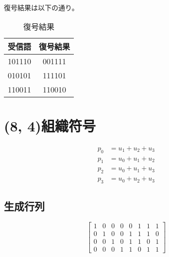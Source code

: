 \documentclass[a4paper,11pt]{jsarticle}
\begin{document}
復号結果は以下の通り。

\begin{table}[hbtp]
  \caption{復号結果}
  \label{table:decoded}
  \centering
  \begin{tabular}{|cc|}
    \hline
    受信語 & 復号結果 \\ \hline
    101110 & 001111 \\ \hline
    010101 & 111101 \\ \hline
    110011 & 110010 \\ \hline
  \end{tabular}
\end{table}

\section{(8, 4)組織符号}
\begin{eqnarray*}
  p_0 &= u_1 + u_2 + u_3 \\
  p_1 &= u_0 + u_1 + u_2 \\
  p_2 &= u_0 + u_1 + u_3 \\
  p_3 &= u_0 + u_2 + u_3
\end{eqnarray*}
\subsection{生成行列}
\begin{equation*}
  \begin{bmatrix}
    1 & 0 & 0 & 0 & 0 & 1 & 1 & 1 \\
    0 & 1 & 0 & 0 & 1 & 1 & 1 & 0 \\
    0 & 0 & 1 & 0 & 1 & 1 & 0 & 1 \\
    0 & 0 & 0 & 1 & 1 & 0 & 1 & 1
  \end{bmatrix}
\end{equation*}
\end{document}
